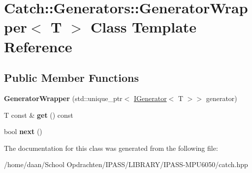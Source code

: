 \hypertarget{classCatch_1_1Generators_1_1GeneratorWrapper}{}\section{Catch\+:\+:Generators\+:\+:Generator\+Wrapper$<$ T $>$ Class Template Reference}
\label{classCatch_1_1Generators_1_1GeneratorWrapper}
\subsection*{Public Member Functions}
\begin{DoxyCompactItemize}
\item 
\mbox{\label{classCatch_1_1Generators_1_1GeneratorWrapper_aecffeafd4fd38d91a52dadf28b6e2b29}} 
{\bfseries Generator\+Wrapper} (std\+::unique\+\_\+ptr$<$ \hyperlink{structCatch_1_1Generators_1_1IGenerator}{I\+Generator}$<$ T $>$$>$ generator)
\item 
\mbox{\label{classCatch_1_1Generators_1_1GeneratorWrapper_a271f0f905f2c473c907550435b81e102}} 
T const  \& {\bfseries get} () const
\item 
\mbox{\label{classCatch_1_1Generators_1_1GeneratorWrapper_acbfdca94811ae02461bd2cf5f60b666e}} 
bool {\bfseries next} ()
\end{DoxyCompactItemize}


The documentation for this class was generated from the following file\+:\begin{DoxyCompactItemize}
\item 
/home/daan/\+School Opdrachten/\+I\+P\+A\+S\+S/\+L\+I\+B\+R\+A\+R\+Y/\+I\+P\+A\+S\+S-\/\+M\+P\+U6050/catch.\+hpp\end{DoxyCompactItemize}
